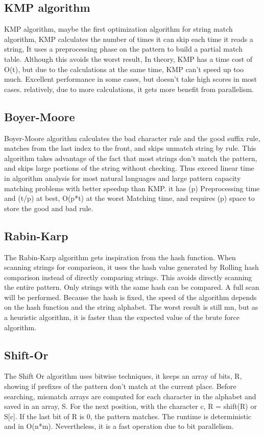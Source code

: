 \documentclass[11pt]{article}       %
\begin{document}
\subsection{KMP algorithm}\label{kmp}
KMP algorithm, maybe the first optimization algorithm\cite{KMP} for string match algorithm, KMP calculates the number of times it can skip each time it reads a string, It uses a preprocessing phase on the pattern to build a partial match table. Although this avoids the worst result, In theory, KMP has a time cost of O(t), but due to the calculations at the same time, KMP can’t speed up too much. Excellent performance in some cases, but doesn’t take high scores in most cases. relatively, due to more calculations, it gets more benefit from parallelism.

\subsection{Boyer-Moore}\label{bm}
Boyer-Moore algorithm calculates the bad character rule and the good suffix rule\cite{BM}, matches from the last index to the front, and skips unmatch string by rule. This algorithm takes advantage of the fact that most strings don’t match the pattern, and skips large portions of the string without checking. Thus exceed linear time in algorithm analysis for most natural languages and large pattern capacity matching problems with better speedup than KMP. it has (p) Preprocessing time and  (t/p) at best, O(p*t) at the worst Matching time, and requires (p) space to store the good and bad rule.


\subsection{Rabin-Karp}\label{rk}
The Rabin-Karp algorithm gets inspiration from the hash function. When scanning strings for comparison, it uses the hash value generated by Rolling hash comparison instead of directly comparing strings\cite{KR}. This avoids directly scanning the entire pattern. Only strings with the same hash can be compared. A full scan will be performed. Because the hash is fixed, the speed of the algorithm depends on the hash function and the string alphabet. The worst result is still mn, but as a heuristic algorithm, it is faster than the expected value of the brute force algorithm.

\subsection{Shift-Or}\label{so}
The Shift Or algorithm uses bitwise techniques\cite{Matching}, it keeps an array of bits, R, showing if prefixes of the pattern don't match at the current place. Before searching, mismatch arrays are computed for each character in the alphabet and saved in an array, S. For the next position, with the character c, R = shift(R) or S[c]. If the last bit of R is 0, the pattern matches. The runtime is deterministic and in O(n*m). Nevertheless, it is a fast operation due to bit parallelism.
\end{document}
